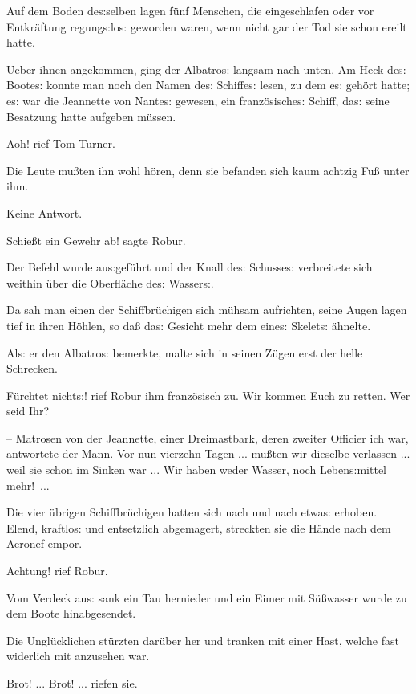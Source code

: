 \documentclass[oneside,12pt]{book}
\newcommand{\s}{s:}
\begin{document}
Auf dem Boden de{\s}selben lagen f\"unf Menschen, die eingeschlafen
oder vor Entkr\"aftung regung{\s}lo{\s} geworden waren, wenn nicht
gar der Tod sie schon ereilt hatte.

Ueber ihnen angekommen, ging der {\glqq}Albatro{\s}{\grqq} langsam
nach unten. Am Heck de{\s} Boote{\s} konnte man noch den Namen de{\s}
Schiffe{\s} lesen, zu dem e{\s} geh\"ort hatte; e{\s} war die
{\glqq}Jeannette{\grqq} von Nante{\s} gewesen, ein franz\"osische{\s}
Schiff, da{\s} seine Besatzung hatte aufgeben m\"ussen.

{\glqq}Aoh!{\grqq} rief Tom Turner.

Die Leute mu{\ss}ten ihn wohl h\"oren, denn sie befanden sich kaum
acht\/zig Fu{\ss} unter ihm.

Keine Antwort.

{\glqq}Schie{\ss}t ein Gewehr ab!{\grqq} sagte Robur.

Der Befehl wurde au{\s}gef\"uhrt und der Knall de{\s} Schusse{\s}
verbreitete sich weithin \"uber die Oberfl\"ache de{\s} Wasser{\s}.

Da sah man einen der Schiffbr\"uchigen sich m\"uhsam aufrichten,
seine Augen lagen tief in ihren H\"ohlen, so da{\ss} da{\s} Gesicht
mehr dem eine{\s} Skelet{\s} \"ahnelte.

Al{\s} er den {\glqq}Albatro{\s}{\grqq} bemerkte, malte sich in
seinen Z\"ugen erst der helle Schrecken.

{\glqq}F\"urchtet nicht{\s}! rief Robur ihm franz\"osisch zu. Wir
kommen Euch zu retten. Wer seid Ihr?{\grqq}

-- Matrosen von der {\glqq}Jeannette{\grqq}, einer Dreimastbark,
deren zweiter Officier ich war, antwortete der Mann. Vor nun vierzehn
Tagen ... mu{\ss}ten wir dieselbe verlassen ... weil sie schon im
Sinken war ... Wir haben weder Wasser, noch Leben{\s}mittel
mehr!~...{\grqq}

Die vier \"ubrigen Schiffbr\"uchigen hatten sich nach und nach
etwa{\s} erhoben. Elend, kraftlo{\s} und entsetzlich abgemagert,
streckten sie die H\"ande nach dem Aeronef empor.

{\glqq}Achtung!{\grqq} rief Robur.

Vom Verdeck au{\s} sank ein Tau hernieder und ein Eimer mit
S\"u{\ss}wasser wurde zu dem Boote hinabgesendet.

Die Ungl\"ucklichen st\"urzten dar\"uber her und tranken mit einer
Hast, welche fast widerlich mit anzusehen war.

{\glqq}Brot! ... Brot! ...{\grqq} riefen sie.
\end{document}
